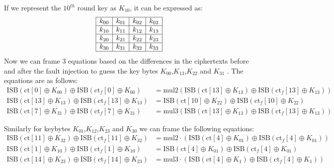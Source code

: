 If we represent the $10^{th}$ round key as \(K_{10}\), it can be expressed as:
\[
    \begin{array}{|c|c|c|c|}
        \hline
        k_{00} & k_{01} & k_{02} & k_{03} \\
        \hline
        k_{10} & k_{11} & k_{12} & k_{13} \\
        \hline
        k_{20} & k_{21} & k_{22} & k_{23} \\
        \hline
        k_{30} & k_{31} & k_{32} & k_{33} \\
        \hline
        \end{array}
\]
Now we can frame 3 equations based on the differences in the ciphertexts before and after the fault injection to guess the key bytes $K_{00}$,$K_{13}$,$K_{22}$ and $K_{31}$ . The equations are as follows:
\begin{align*}
    \text{ISB}(\text{ct}[0] \oplus K_{00}) \oplus \text{ISB}(\text{ct}_f[0] \oplus K_{00}) 
    &= \text{mul2} \left( \text{ISB}(\text{ct}[13] \oplus K_{13}) \oplus \text{ISB}(\text{ct}_f[13] \oplus K_{13}) \right)\\
    \text{ISB}(\text{ct}[13] \oplus K_{13}) \oplus \text{ISB}(\text{ct}_f[13] \oplus K_{13}) 
    &= \text{ISB}(\text{ct}[10] \oplus K_{22}) \oplus \text{ISB}(\text{ct}_f[10] \oplus K_{22})\\
    \text{ISB}(\text{ct}[7] \oplus K_{31}) \oplus \text{ISB}(\text{ct}_f[7] \oplus K_{31}) 
    &= \text{mul3} \left( \text{ISB}(\text{ct}[13] \oplus K_{13}) \oplus \text{ISB}(\text{ct}_f[13] \oplus K_{13}) \right)
    \end{align*}

Similarly for keybytes $K_{01}$,$K_{12}$,$K_{23}$ and $K_{30}$ we can frame the following equations:
\begin{align*}
    \text{ISB}(\text{ct}[11] \oplus K_{32}) \oplus \text{ISB}(\text{ct}_f[11] \oplus K_{32}) &= \text{mul2} \cdot \left( \text{ISB}(\text{ct}[4] \oplus K_{01}) \oplus \text{ISB}(\text{ct}_f[4] \oplus K_{01}) \right) \\
    \text{ISB}(\text{ct}[1] \oplus K_{10}) \oplus \text{ISB}(\text{ct}_f[1] \oplus K_{10}) &= \text{ISB}(\text{ct}[4] \oplus K_{01}) \oplus \text{ISB}(\text{ct}_f[4] \oplus K_{01}) \\
    \text{ISB}(\text{ct}[14] \oplus K_{23}) \oplus \text{ISB}(\text{ct}_f[14] \oplus K_{23}) &= \text{mul3} \cdot \left( \text{ISB}(\text{ct}[4] \oplus K_{1}) \oplus \text{ISB}(\text{ct}_f[4] \oplus K_{1}) \right)
    \end{align*}

